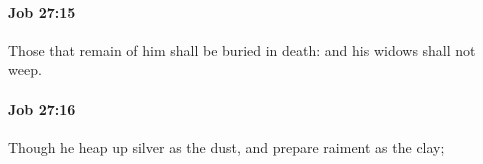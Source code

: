 		\paragraph{Job 27:15} %
			\label{JOB-27-15}

			Those that remain of him shall be buried in death: and his widows shall not weep.


		\paragraph{Job 27:16} %
			\label{JOB-27-16}

			Though he heap up silver as the dust, and prepare raiment as the clay;



